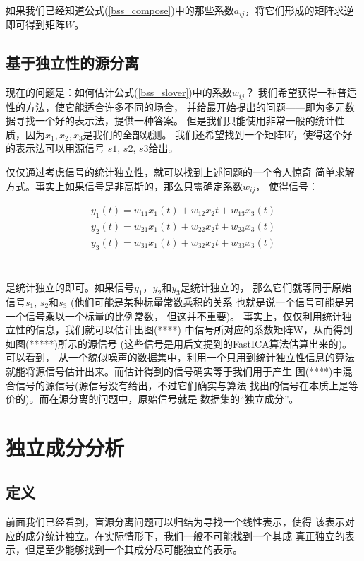 如果我们已经知道公式(\ref{bss_compose})中的那些系数$a_{ij}$，将它们形成的矩阵求逆
即可得到矩阵$W$。
    
\subsection{基于独立性的源分离\cite{AAPO01}}
现在的问题是：如何估计公式(\ref{bss_slover})中的系数$w_{ij}$？
我们希望获得一种普适性的方法，使它能适合许多不同的场合，
并给最开始提出的问题——即为多元数据寻找一个好的表示法，提供一种答案。
但是我们只能使用非常一般的统计性质，因为$x_1, x_2, x_3$是我们的全部观测。
我们还希望找到一个矩阵$W$，使得这个好的表示法可以用源信号
$s1$, $s2$, $s3$给出。
    
仅仅通过考虑信号的统计独立性，就可以找到上述问题的一个令人惊奇
简单求解方式。事实上如果信号是非高斯的，那么只需确定系数$w_{ij}$，
使得信号：
\parbox{10cm}{
\begin{eqnarray*}
y_1(t)=w_{11}x_1(t)+w_{12}x_2{t}+w_{13}x_3(t) \\
y_2(t)=w_{21}x_1(t)+w_{22}x_2{t}+w_{23}x_3(t) \\
y_3(t)=w_{31}x_1(t)+w_{32}x_2{t}+w_{33}x_3(t) \\
\end{eqnarray*}
}\hfill
\parbox{3cm}{\begin{eqnarray}\label{bss_slover} \end{eqnarray}}

是统计独立的即可。如果信号$y_1$，$y_2$和$y_3$是统计独立的，
那么它们就等同于原始信号$s_1$, $s_2$和$s_3$
(他们可能是某种标量常数乘积的关系
也就是说一个信号可能是另一个信号乘以一个标量的比例常数，
但这并不重要)。
    事实上，仅仅利用统计独立性的信息，我们就可以估计出图(****)
中信号所对应的系数矩阵W，从而得到如图(*****)所示的源信号
(这些信号是用后文提到的FastICA算法估算出来的)。可以看到，
从一个貌似噪声的数据集中，利用一个只用到统计独立性信息的算法
就能将源信号估计出来。而估计得到的信号确实等于我们用于产生
图(****)中混合信号的源信号(源信号没有给出，不过它们确实与算法
找出的信号在本质上是等价的)。而在源分离的问题中，原始信号就是
数据集的“独立成分”。


\section{独立成分分析\cite{AAPO01}}
\subsection{定义}
前面我们已经看到，盲源分离问题可以归结为寻找一个线性表示，使得
该表示对应的成分统计独立。在实际情形下，我们一般不可能找到一个其成
真正独立的表示，但是至少能够找到一个其成分尽可能独立的表示。

